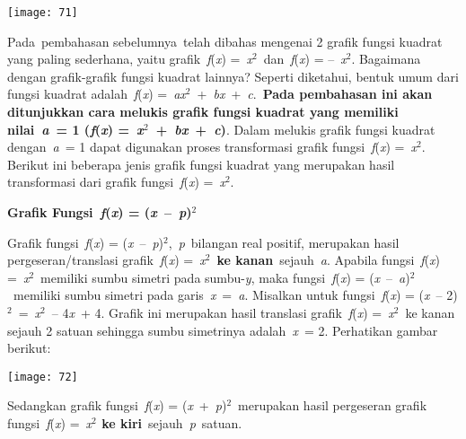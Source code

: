 \documentclass[11pt,fleqn]{book} %
\begin{document}
\begin{center}
\noindent \texttt{[image: 71]}\textbf{}
\end{center}

Pada~pembahasan sebelumnya~telah dibahas mengenai 2 grafik fungsi kuadrat yang paling sederhana, yaitu grafik~\textit{f}(\textit{x}) =~\textit{x}${}^{2}$~dan~\textit{f}(\textit{x}) = --~\textit{x}${}^{2}$. Bagaimana dengan grafik-grafik fungsi kuadrat lainnya? Seperti diketahui, bentuk umum dari fungsi kuadrat adalah~\textit{f}(\textit{x}) =~\textit{ax}${}^{2}$~+~\textit{bx}~+~\textit{c}.~\textbf{Pada pembahasan ini akan ditunjukkan cara melukis grafik fungsi kuadrat yang memiliki nilai~\textit{a}~= 1 (\textit{f}(\textit{x}) =~\textit{x}${}^{2}$~+~\textit{bx}~+~\textit{c})}. Dalam melukis grafik fungsi kuadrat dengan~\textit{a}~= 1 dapat digunakan proses transformasi grafik fungsi~\textit{f}(\textit{x}) =~\textit{x}${}^{2}$. Berikut ini beberapa jenis grafik fungsi kuadrat yang merupakan hasil transformasi dari grafik fungsi~\textit{f}(\textit{x}) =~\textit{x}${}^{2}$.

\noindent \textbf{Grafik Fungsi~\textit{f}(\textit{x}) = (\textit{x}~--~\textit{p})${}^{2}$}

\noindent Grafik fungsi~\textit{f}(\textit{x}) = (\textit{x}~--~\textit{p})${}^{2}$,~\textit{p}~bilangan real positif, merupakan hasil pergeseran/translasi grafik~\textit{f}(\textit{x}) =~\textit{x}${}^{2}$~\textbf{ke kanan}~sejauh~\textit{a}. Apabila fungsi~\textit{f}(\textit{x}) =~\textit{x}${}^{2}$~memiliki sumbu simetri pada sumbu-\textit{y}, maka fungsi~\textit{f}(\textit{x}) = (\textit{x}~--~\textit{a})${}^{2}$~memiliki sumbu simetri pada garis~\textit{x}~=~\textit{a}. Misalkan untuk fungsi~\textit{f}(\textit{x}) = (\textit{x}~-- 2)${}^{2}$~=~\textit{x}${}^{2}$~-- 4\textit{x}~+ 4. Grafik ini merupakan hasil translasi grafik~\textit{f}(\textit{x}) =~\textit{x}${}^{2}$~ke kanan sejauh 2 satuan sehingga sumbu simetrinya adalah~\textit{x}~= 2. Perhatikan gambar berikut:

\begin{center}
\noindent \texttt{[image: 72]}\textbf{}
\end{center}

\noindent Sedangkan grafik fungsi~\textit{f}(\textit{x}) = (\textit{x}~+~\textit{p})${}^{2}$~merupakan hasil pergeseran grafik fungsi~\textit{f}(\textit{x}) =~\textit{x}${}^{2}$ ${}^{ }$\textbf{ke kiri}~sejauh~\textit{p}~satuan.
\end{document}
